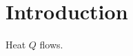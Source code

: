 \documentclass{article}
\begin{document}
\section{Introduction}
\begin{table}[t]\begin{framed}\printnomenclature\end{framed}\end{table}
Heat $Q$ flows.
\end{document}
